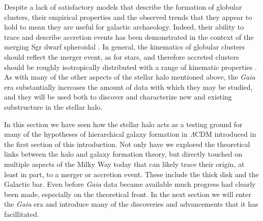 Despite a lack of satisfactory models that describe the formation of globular clusters, their empirical properties and the observed trends that they appear to hold to mean they are useful for galactic archaeology. Indeed, their ability to trace and describe accretion events has been demonstrated in the context of the merging Sgr dwarf spheroidal \parencite{law10}. In general, the kinematics of globular clusters should reflect the merger event, as for stars, and therefore accreted clusters should be roughly isotropically distributed with a range of kinematic properties \parencite[linking back to the hypothesis of ][]{searle78}. As with many of the other aspects of the stellar halo mentioned above, the \textit{Gaia} era substantially increases the amount of data with which they may be studied, and they will be used both to discover and characterize new and existing substructure in the stellar halo.

In this section we have seen how the stellar halo acts as a testing ground for many of the hypotheses of hierarchical galaxy formation in $\Lambda$CDM introduced in the first section of this introduction. Not only have we explored the theoretical links between the halo and galaxy formation theory, but directly touched on multiple aspects of the Milky Way today that can likely trace their origin, at least in part, to a merger or accretion event. These include the thick disk and the Galactic bar. Even before \textit{Gaia} data became available much progress had clearly been made, especially on the theoretical front. In the next section we will enter the \textit{Gaia} era and introduce many of the discoveries and advancements that it has facillitated.